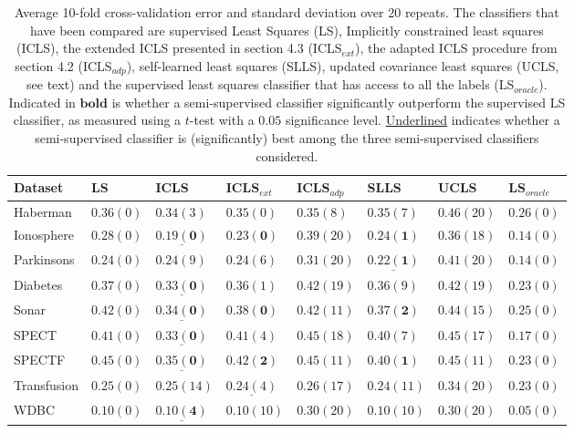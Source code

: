 \documentclass{elsarticle}
\begin{document}
% 

\begin{table}
\caption{Average 10-fold cross-validation error and standard deviation over 20 repeats. The classifiers that have been compared are supervised Least Squares (LS), Implicitly constrained least squares (ICLS), the extended ICLS presented in section 4.3 (ICLS$_{ext}$), the adapted ICLS procedure from section 4.2 (ICLS$_{adp}$),  self-learned least squares (SLLS), updated covariance least squares (UCLS, see text) and the supervised least squares classifier that has access to all the labels (LS$_{oracle}$). Indicated in $\mathbf{bold}$ is whether a semi-supervised classifier significantly outperform the supervised LS classifier, as measured using a $t$-test with a $0.05$ significance level. \underline{Underlined} indicates whether a semi-supervised classifier is (significantly) best among the three semi-supervised classifiers considered.} \label{table:cvresults}
\begin{tabular}{l|lllllll}
Dataset & LS & ICLS & ICLS$_{ext}$ & ICLS$_{adp}$ & SLLS & UCLS & LS$_{oracle}$ \\ 
\hline
Haberman & $0.36 (0)$& $0.34 (3)$& $0.35 (0)$& $0.35 (8)$& $0.35 (7)$& $0.46 (20)$& $0.26 (0)$\\ 
Ionosphere & $0.28 (0)$& $\mathbf{\underline{0.19 (0)}} $& $\mathbf{0.23 (0)} $& $0.39 (20)$& $\mathbf{0.24 (1)} $& $0.36 (18)$& $0.14 (0)$\\ 
Parkinsons & $0.24 (0)$& $0.24 (9)$& $0.24 (6)$& $0.31 (20)$& $\mathbf{\underline{0.22 (1)}} $& $0.41 (20)$& $0.14 (0)$\\ 
Diabetes & $0.37 (0)$& $\mathbf{\underline{0.33 (0)}} $& $0.36 (1)$& $0.42 (19)$& $0.36 (9)$& $0.42 (19)$& $0.23 (0)$\\ 
Sonar & $0.42 (0)$& $\mathbf{\underline{0.34 (0)}} $& $\mathbf{0.38 (0)} $& $0.42 (11)$& $\mathbf{0.37 (2)} $& $0.44 (15)$& $0.25 (0)$\\ 
SPECT & $0.41 (0)$& $\mathbf{\underline{0.33 (0)}} $& $0.41 (4)$& $0.45 (18)$& $0.40 (7)$& $0.45 (17)$& $0.17 (0)$\\ 
SPECTF & $0.45 (0)$& $\mathbf{\underline{0.35 (0)}} $& $\mathbf{0.42 (2)} $& $0.45 (11)$& $\mathbf{0.40 (1)} $& $0.45 (11)$& $0.23 (0)$\\ 
Transfusion & $0.25 (0)$& $0.25 (14)$& $\underline{0.24 (4)}$& $0.26 (17)$& $0.24 (11)$& $0.34 (20)$& $0.23 (0)$\\ 
WDBC & $0.10 (0)$& $\mathbf{\underline{0.10 (4)}} $& $0.10 (10)$& $0.30 (20)$& $0.10 (10)$& $0.30 (20)$& $0.05 (0)$\\ 

\end{tabular}
\end{table}
\end{document}
